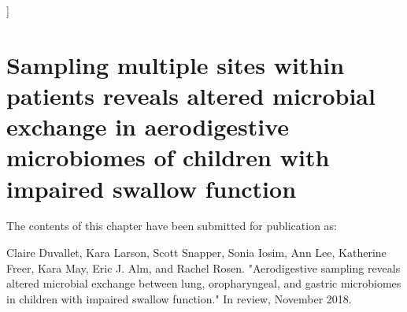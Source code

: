 
\graphicspath{{aspiration/figures/}}]

\chapter{Sampling multiple sites within patients reveals altered microbial exchange in aerodigestive microbiomes of children with impaired swallow function}

The contents of this chapter have been submitted for publication as:

Claire Duvallet, Kara Larson, Scott Snapper, Sonia Iosim, Ann Lee, Katherine Freer, Kara May, Eric J. Alm, and Rachel Rosen. "Aerodigestive sampling reveals altered microbial exchange between lung, oropharyngeal, and gastric microbiomes in children with impaired swallow function." In review, November 2018.

\clearpage


\clearpage


